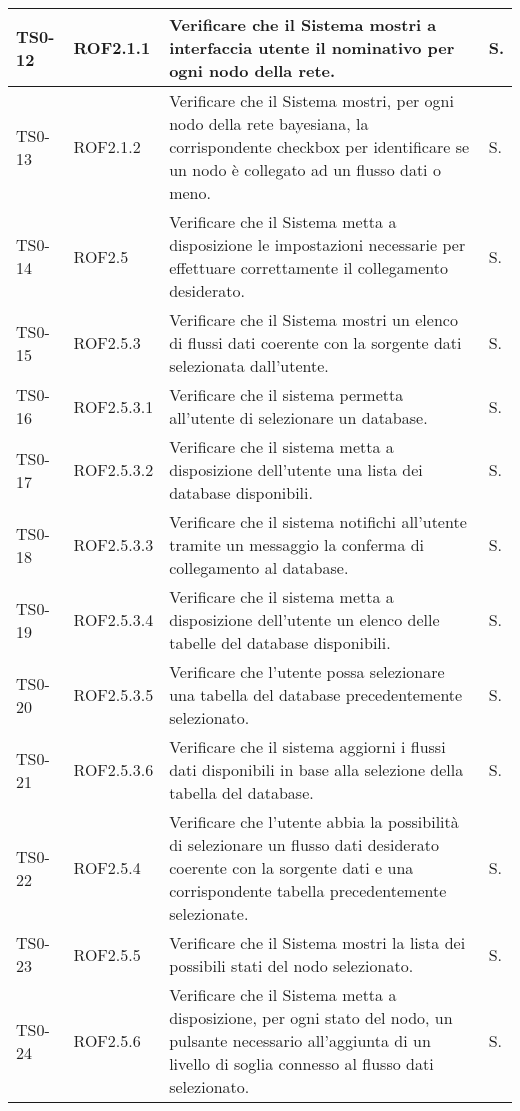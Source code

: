 \begin{longtable}{|C{.15\textwidth}|C{.14\textwidth}|m{.52\textwidth}|m{.08\textwidth}|}
\hline
TS0-12 & ROF2.1.1 & Verificare che il Sistema mostri a interfaccia utente il nominativo per ogni nodo della rete.& S.\\
\hline
{} TS0-13 & ROF2.1.2& Verificare che il Sistema mostri, per ogni nodo della rete bayesiana, la corrispondente checkbox per identificare se un nodo è collegato ad un flusso dati o meno. & S. \\
\hline
TS0-14 & ROF2.5 & Verificare che il Sistema metta a disposizione le impostazioni necessarie per effettuare correttamente il collegamento desiderato. & S. \\ 
\hline
{}TS0-15 & ROF2.5.3 & Verificare che il Sistema mostri un elenco di flussi dati coerente con la sorgente dati selezionata dall'utente. & S. \\
\hline
TS0-16 & ROF2.5.3.1 & Verificare che il sistema permetta all'utente di selezionare un database. & S. \\ 
\hline
{}TS0-17 & ROF2.5.3.2 & Verificare che il sistema metta a disposizione dell'utente una lista dei database disponibili. & S. \\ 
\hline
TS0-18 & ROF2.5.3.3 & Verificare che il sistema notifichi all'utente tramite un messaggio la conferma di collegamento al database. & S. \\
\hline 
{}TS0-19 & ROF2.5.3.4 & Verificare che il sistema metta a disposizione dell'utente un elenco delle tabelle del database disponibili. & S. \\
\hline
TS0-20 & ROF2.5.3.5 & Verificare che l'utente possa selezionare una tabella del database precedentemente selezionato. & S. \\
\hline
{}TS0-21 & ROF2.5.3.6 & Verificare che il sistema aggiorni i flussi dati disponibili in base alla selezione della tabella del database. & S. \\ 
\hline
TS0-22 & ROF2.5.4 & Verificare che l'utente abbia la possibilità di selezionare un flusso dati desiderato coerente con la sorgente dati e  una corrispondente tabella precedentemente selezionate. & S. \\ 
\hline
{}TS0-23 & ROF2.5.5 & Verificare che il Sistema mostri la lista dei possibili stati del nodo selezionato. & S. \\ 
\hline
TS0-24 & ROF2.5.6 & Verificare che il Sistema metta a disposizione, per ogni stato del nodo, un pulsante necessario all'aggiunta di un livello di soglia connesso al flusso dati selezionato. & S. \\

\end{longtable}
